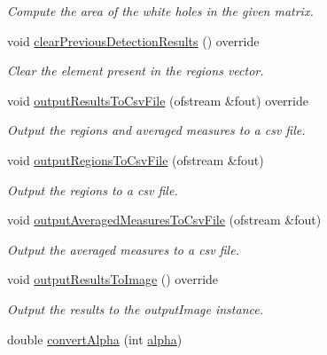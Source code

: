 \begin{DoxyCompactItemize}
\begin{DoxyCompactList}\small\item\em Compute the area of the white holes in the given matrix. \end{DoxyCompactList}\item 
void \hyperlink{classmultiscale_1_1analysis_1_1RegionDetector_a4a89f3a28cbb473acc32f22b49d09389}{clear\-Previous\-Detection\-Results} () override
\begin{DoxyCompactList}\small\item\em Clear the element present in the regions vector. \end{DoxyCompactList}\item 
void \hyperlink{classmultiscale_1_1analysis_1_1RegionDetector_a9da92f7959fe324f24301c5bf780fbbd}{output\-Results\-To\-Csv\-File} (ofstream \&fout) override
\begin{DoxyCompactList}\small\item\em Output the regions and averaged measures to a csv file. \end{DoxyCompactList}\item 
void \hyperlink{classmultiscale_1_1analysis_1_1RegionDetector_a9289ea9b1ceb3bd21317170d72a889e4}{output\-Regions\-To\-Csv\-File} (ofstream \&fout)
\begin{DoxyCompactList}\small\item\em Output the regions to a csv file. \end{DoxyCompactList}\item 
void \hyperlink{classmultiscale_1_1analysis_1_1RegionDetector_ac060acf205b878f79b67093f178f265f}{output\-Averaged\-Measures\-To\-Csv\-File} (ofstream \&fout)
\begin{DoxyCompactList}\small\item\em Output the averaged measures to a csv file. \end{DoxyCompactList}\item 
void \hyperlink{classmultiscale_1_1analysis_1_1RegionDetector_a23a3ada51983d2a3041f403323e27d06}{output\-Results\-To\-Image} () override
\begin{DoxyCompactList}\small\item\em Output the results to the output\-Image instance. \end{DoxyCompactList}\item 
double \hyperlink{classmultiscale_1_1analysis_1_1RegionDetector_a3de7a4d365c182917b74117a22075ec4}{convert\-Alpha} (int \hyperlink{classmultiscale_1_1analysis_1_1RegionDetector_ab768a3bbfff9835b441a889ab2cb05a6}{alpha})

\end{DoxyCompactItemize}
